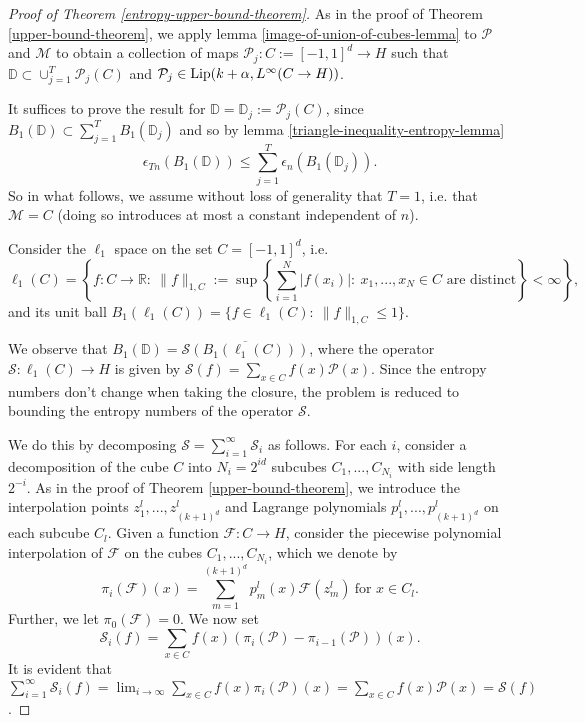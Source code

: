 \begin{proof}[Proof of Theorem \ref{entropy-upper-bound-theorem}]
 As in the proof of Theorem \ref{upper-bound-theorem}, we apply lemma \ref{image-of-union-of-cubes-lemma} to $\mathcal{P}$ and $\mathcal{M}$ to obtain a collection of maps $\mathcal{P}_j:C:=[-1,1]^d\rightarrow H$ such that $\mathbb{D}\subset \cup_{j=1}^T\mathcal{P}_j(C)$ and $\mathcal{P}_j\in {\rm Lip}(k+\alpha, L^\infty(C\rightarrow H))$. 
 
 It suffices to prove the result for $\mathbb{D} = \mathbb{D}_j := \mathcal{P}_j(C)$, since $B_1(\mathbb{D}) \subset \sum_{j=1}^T B_1(\mathbb{D}_j)$ and so by lemma \ref{triangle-inequality-entropy-lemma}
 \begin{equation}
  \epsilon_{Tn}(B_1(\mathbb{D})) \leq \sum_{j=1}^T \epsilon_n(B_1(\mathbb{D}_j)).
 \end{equation}
 So in what follows, we assume without loss of generality that $T=1$, i.e. that $\mathcal{M} = C$ (doing so introduces at most a constant independent of $n$).
 
 Consider the $\ell_1$ space on the set $C = [-1,1]^d$, i.e. 
 \begin{equation}
 \ell_1(C) = \left\{f:C\rightarrow \mathbb{R}:~\|f\|_{1,C} := \sup \left\{\sum_{i=1}^N |f(x_i)|:~\text{$x_1,...,x_N\in C$ are distinct}\right\} < \infty\right\},
 \end{equation}
 and its unit ball $B_1(\ell_1(C)) = \{f\in \ell_1(C):~\|f\|_{1,C} \leq 1\}$.
 
 We observe that $B_1(\mathbb{D}) = \overline{\mathcal{S}(B_1(\ell_1(C)))}$, where the operator $\mathcal{S}:\ell_1(C)\rightarrow H$ is given by $\mathcal{S}(f) = \sum_{x\in C} f(x)\mathcal{P}(x)$. Since the entropy numbers don't change when taking the closure, the problem is reduced to bounding the entropy numbers of the operator $\mathcal{S}$.
 
 We do this by decomposing $\mathcal{S} = \sum_{i=1}^\infty \mathcal{S}_i$ as follows. For each $i$, consider a decomposition of the cube $C$ into $N_i = 2^{id}$ subcubes $C_1,...,C_{N_i}$ with side length $2^{-i}$. As in the proof of Theorem \ref{upper-bound-theorem}, we introduce the interpolation points $z_1^l,...,z_{(k+1)^d}^l$ and Lagrange polynomials $p_1^l,...,p_{(k+1)^d}^l$ on each subcube $C_l$. Given a function $\mathcal{F}:C\rightarrow H$, consider the piecewise polynomial interpolation of $\mathcal{F}$ on the cubes $C_1,...,C_{N_i}$, which we denote by
 \begin{equation}
  \pi_i(\mathcal{F})(x) = \sum_{m=1}^{(k+1)^d}p_m^l(x)\mathcal{F}(z_m^l)~\text{for $x\in C_l$}.
 \end{equation}
 Further, we let $\pi _0(\mathcal{F}) = 0$. We now set
 \begin{equation}
  \mathcal{S}_i(f) = \sum_{x\in C} f(x)(\pi_i(\mathcal{P}) - \pi_{i-1}(\mathcal{P}))(x).
 \end{equation}
 It is evident that $\sum_{i=1}^\infty \mathcal{S}_i(f) = \lim_{i\rightarrow \infty} \sum_{x\in C} f(x)\pi_i(\mathcal{P})(x) = \sum_{x\in C} f(x)\mathcal{P}(x) = \mathcal{S}(f)$.
 

\end{proof}
